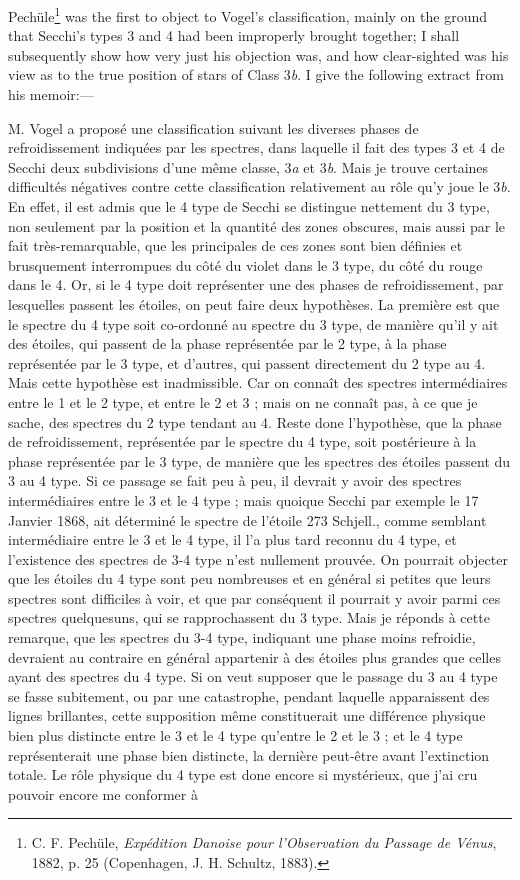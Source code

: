 \documentclass[a4paper, 12pt, oneside, polutonikogreek, english]{article}
\begin{document}
Pechüle\footnote{C. F. Pechüle, \emph{Expédition Danoise pour l'Observation du Passage de Vénus}, 1882, p. 25 (Copenhagen, J. H. Schultz, 1883).} was the first to object to Vogel's classification, mainly on the ground that Secchi's types 3 and 4 had been improperly brought together; I shall subsequently show how very just his objection was, and how clear-sighted was his view as to the true position of stars of Class 3\emph{b}. I give the following extract from his memoir:---

M. Vogel a proposé une classification suivant les diverses phases de refroidissement indiquées par les spectres, dans laquelle il fait des types 3 et 4 de Secchi deux subdivisions d'une même classe, 3\emph{a} et 3\emph{b}. Mais je trouve certaines difficultés négatives contre cette classification relativement au rôle qu'y joue le 3\emph{b}. En effet, il est admis que le 4 type de Secchi se distingue nettement du 3 type, non seulement par la position et la quantité des zones obscures, mais aussi par le fait très-remarquable, que les principales de ces zones sont bien définies et brusquement interrompues du côté du violet dans le 3 type, du côté du rouge dans le 4. Or, si le 4 type doit représenter une des phases de refroidissement, par lesquelles passent les étoiles, on peut faire deux hypothèses. La première est que le spectre du 4 type soit co-ordonné au spectre du 3 type, de manière qu'il y ait des étoiles, qui passent de la phase représentée par le 2 type, à la phase représentée par le 3 type, et d'autres, qui passent directement du 2 type au 4. Mais cette hypothèse est inadmissible. Car on connaît des spectres intermédiaires entre le 1 et le 2 type, et entre le 2 et 3 ; mais on ne connaît pas, à ce que je sache, des spectres du 2 type tendant au 4. Reste done l'hypothèse, que la phase de refroidissement, représentée par le spectre du 4 type, soit postérieure à la phase représentée par le 3 type, de manière que les spectres des étoiles passent du 3 au 4 type. Si ce passage se fait peu à peu, il devrait y avoir des spectres intermédiaires entre le 3 et le 4 type ; mais quoique Secchi par exemple le 17 Janvier 1868, ait déterminé le spectre de l'étoile 273 Schjell., comme semblant intermédiaire entre le 3 et le 4 type, il l'a plus tard reconnu du 4 type, et l'existence des spectres de 3-4 type n'est nullement prouvée. On pourrait objecter que les étoiles du 4 type sont peu nombreuses et en général si petites que leurs spectres sont difficiles à voir, et que par conséquent il pourrait y avoir parmi ces spectres quelquesuns, qui se rapprochassent du 3 type. Mais je réponds à cette remarque, que les spectres du 3-4 type, indiquant une phase moins refroidie, devraient au contraire en général appartenir à des étoiles plus grandes que celles ayant des spectres du 4 type. Si on veut supposer que le passage du 3 au 4 type se fasse subitement, ou par une catastrophe, pendant laquelle apparaissent des lignes brillantes, cette supposition même constituerait une différence physique bien plus distincte entre le 3 et le 4 type qu'entre le 2 et le 3 ; et le 4 type représenterait une phase bien distincte, la dernière peut-être avant l'extinction totale. Le rôle physique du 4 type est done encore si mystérieux, que j'ai cru pouvoir encore me conformer à 
\end{document}
